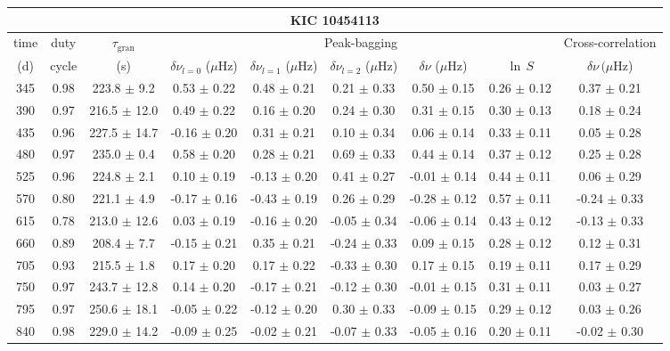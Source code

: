 \documentclass[twocolumn]{aastex61}%
\begin{document}
\begin{table*}[ht]\centering\fontsize{9.}{7.}\selectfont
\begin{tabular}{ccc|ccccc|c}
\multicolumn{9}{c}{KIC 10454113}\\ \hline\hline
time & duty & $\tau_\text{gran}$ &\multicolumn{5}{c|}{Peak-bagging}&Cross-correlation\\
(d)& cycle & (s)&$\delta\nu_{l=0}$ ($\mu$Hz) & $\delta\nu_{l=1}$ ($\mu$Hz) & $\delta\nu_{l=2}$ ($\mu$Hz) & $\delta\nu$ ($\mu$Hz)& $\ln\,S$ & $\delta\nu\,(\mu$Hz)\\\hline
345 & 0.98 & 223.8 $\pm$ 9.2 & 0.53 $\pm$ 0.22 & 0.48 $\pm$ 0.21 & 0.21 $\pm$ 0.33 & 0.50 $\pm$ 0.15 & 0.26 $\pm$ 0.12 & 0.37 $\pm$ 0.21\\
390 & 0.97 & 216.5 $\pm$ 12.0 & 0.49 $\pm$ 0.22 & 0.16 $\pm$ 0.20 & 0.24 $\pm$ 0.30 & 0.31 $\pm$ 0.15 & 0.30 $\pm$ 0.13 & 0.18 $\pm$ 0.24\\
435 & 0.96 & 227.5 $\pm$ 14.7 & -0.16 $\pm$ 0.20 & 0.31 $\pm$ 0.21 & 0.10 $\pm$ 0.34 & 0.06 $\pm$ 0.14 & 0.33 $\pm$ 0.11 & 0.05 $\pm$ 0.28\\
480 & 0.97 & 235.0 $\pm$ 0.4 & 0.58 $\pm$ 0.20 & 0.28 $\pm$ 0.21 & 0.69 $\pm$ 0.33 & 0.44 $\pm$ 0.14 & 0.37 $\pm$ 0.12 & 0.25 $\pm$ 0.28\\
525 & 0.96 & 224.8 $\pm$ 2.1 & 0.10 $\pm$ 0.19 & -0.13 $\pm$ 0.20 & 0.41 $\pm$ 0.27 & -0.01 $\pm$ 0.14 & 0.44 $\pm$ 0.11 & 0.06 $\pm$ 0.29\\
570 & 0.80 & 221.1 $\pm$ 4.9 & -0.17 $\pm$ 0.16 & -0.43 $\pm$ 0.19 & 0.26 $\pm$ 0.29 & -0.28 $\pm$ 0.12 & 0.57 $\pm$ 0.11 & -0.24 $\pm$ 0.33\\
615 & 0.78 & 213.0 $\pm$ 12.6 & 0.03 $\pm$ 0.19 & -0.16 $\pm$ 0.20 & -0.05 $\pm$ 0.34 & -0.06 $\pm$ 0.14 & 0.43 $\pm$ 0.12 & -0.13 $\pm$ 0.33\\
660 & 0.89 & 208.4 $\pm$ 7.7 & -0.15 $\pm$ 0.21 & 0.35 $\pm$ 0.21 & -0.24 $\pm$ 0.33 & 0.09 $\pm$ 0.15 & 0.28 $\pm$ 0.12 & 0.12 $\pm$ 0.31\\
705 & 0.93 & 215.5 $\pm$ 1.8 & 0.17 $\pm$ 0.20 & 0.17 $\pm$ 0.22 & -0.33 $\pm$ 0.30 & 0.17 $\pm$ 0.15 & 0.19 $\pm$ 0.11 & 0.17 $\pm$ 0.29\\
750 & 0.97 & 243.7 $\pm$ 12.8 & 0.14 $\pm$ 0.20 & -0.17 $\pm$ 0.21 & -0.12 $\pm$ 0.30 & -0.01 $\pm$ 0.15 & 0.31 $\pm$ 0.11 & 0.03 $\pm$ 0.27\\
795 & 0.97 & 250.6 $\pm$ 18.1 & -0.05 $\pm$ 0.22 & -0.12 $\pm$ 0.20 & 0.30 $\pm$ 0.33 & -0.09 $\pm$ 0.15 & 0.29 $\pm$ 0.12 & 0.03 $\pm$ 0.26\\
840 & 0.98 & 229.0 $\pm$ 14.2 & -0.09 $\pm$ 0.25 & -0.02 $\pm$ 0.21 & -0.07 $\pm$ 0.33 & -0.05 $\pm$ 0.16 & 0.20 $\pm$ 0.11 & -0.02 $\pm$ 0.30\\

\end{tabular}
\end{table*}
\end{document}
